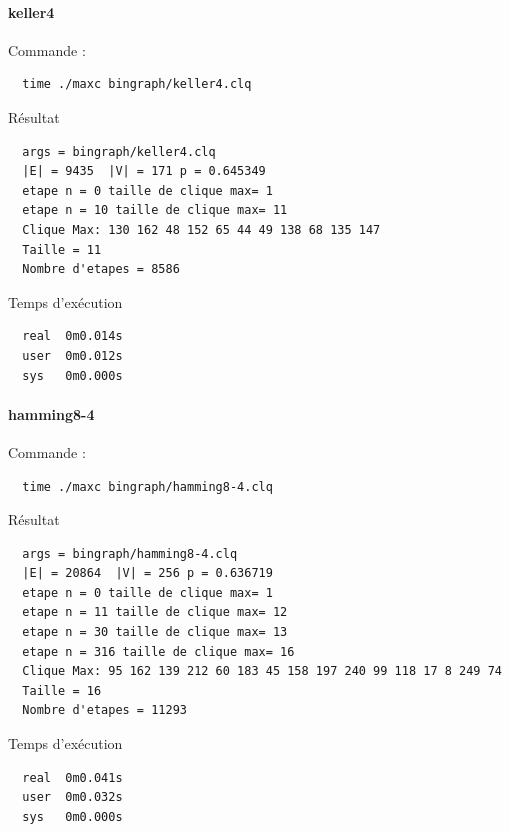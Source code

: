 \documentclass{article}
\begin{document}
\paragraph{keller4}
Commande :
\begin{verbatim}
  time ./maxc bingraph/keller4.clq
\end{verbatim}
Résultat
\begin{verbatim}
  args = bingraph/keller4.clq
  |E| = 9435  |V| = 171 p = 0.645349
  etape n = 0 taille de clique max= 1
  etape n = 10 taille de clique max= 11
  Clique Max: 130 162 48 152 65 44 49 138 68 135 147
  Taille = 11
  Nombre d'etapes = 8586
\end{verbatim}
Temps d'exécution
\begin{verbatim}
  real  0m0.014s
  user  0m0.012s
  sys   0m0.000s
\end{verbatim}
\paragraph{hamming8-4}
Commande :
\begin{verbatim}
  time ./maxc bingraph/hamming8-4.clq
\end{verbatim}
Résultat
\begin{verbatim}
  args = bingraph/hamming8-4.clq
  |E| = 20864  |V| = 256 p = 0.636719
  etape n = 0 taille de clique max= 1
  etape n = 11 taille de clique max= 12
  etape n = 30 taille de clique max= 13
  etape n = 316 taille de clique max= 16
  Clique Max: 95 162 139 212 60 183 45 158 197 240 99 118 17 8 249 74
  Taille = 16
  Nombre d'etapes = 11293
\end{verbatim}
Temps d'exécution
\begin{verbatim}
  real  0m0.041s
  user  0m0.032s
  sys   0m0.000s

\end{verbatim}
\end{document}

